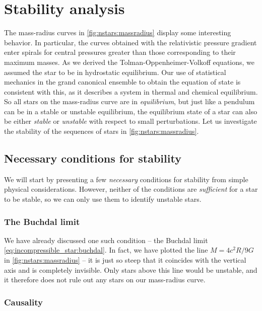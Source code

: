 \section{Stability analysis}
\label{sec:nstars:stability}

The mass-radius curves in \cref{fig:nstars:massradius} display some interesting behavior.
In particular, the curves obtained with the relativistic pressure gradient enter spirals for central pressures greater than those corresponding to their maximum masses.
As we derived the Tolman-Oppenheimer-Volkoff equations, we assumed the star to be in hydrostatic equilibrium.
Our use of statistical mechanics in the grand canonical ensemble to obtain the equation of state is consistent with this, as it describes a system in thermal and chemical equilibrium.
So all stars on the mass-radius curve are in \emph{equilibrium}, but just like a pendulum can be in a stable or unstable equilibrium, the equilibrium state of a star can also be either \emph{stable} or \emph{unstable} with respect to small perturbations.
Let us investigate the stability of the sequences of stars in \cref{fig:nstars:massradius}.

\subsection{Necessary conditions for stability}
\label{sec:nstars:stability_necessary}

We will start by presenting a few \emph{necessary} conditions for stability from simple physical considerations.
However, neither of the conditions are \emph{sufficient} for a star to be stable, so we can only use them to identify unstable stars.

\subsubsection{The Buchdal limit}

We have already discussed one such condition -- the Buchdal limit \eqref{eq:incompressible_star:buchdal}.
In fact, we have plotted the line $M = 4 c^2 R / 9 G$ in \cref{fig:nstars:massradius} -- it is just so steep that it coincides with the vertical axis and is completely invisible.
Only stars above this line would be unstable, and it therefore does not rule out any stars on our mass-radius curve.

\subsubsection{Causality}

